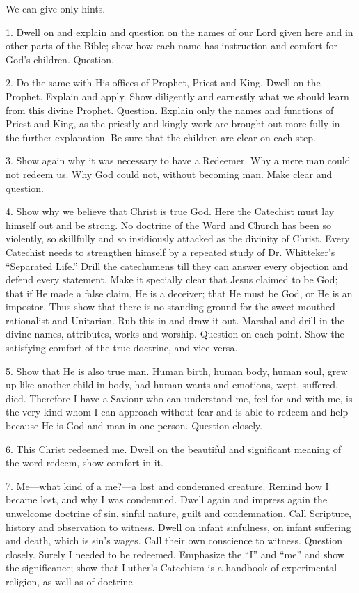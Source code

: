 We can give only hints.

1. Dwell on and explain and question on the names of our Lord given here and in other parts of the Bible; show how each name has instruction and comfort for God’s children. Question.

 2. Do the same with His offices of Prophet, Priest and King. Dwell on the Prophet. Explain and apply. Show diligently and earnestly what we should learn from this divine Prophet. Question. Explain only the names and functions of Priest and King, as the priestly and kingly work are brought out more fully in the further explanation. Be sure that the children are clear on each step.

3. Show again why it was necessary to have a Redeemer. Why a mere man could not redeem us. Why God could not, without becoming man. Make clear and question.

 4. Show why we believe that Christ is true God. Here the Catechist must lay himself out and be strong. No doctrine of the Word and Church has been so violently, so skillfully and so insidiously attacked as the divinity of Christ. Every Catechist needs to strengthen himself by a repeated study of Dr. Whitteker’s “Separated Life.” Drill the catechumens till they can answer every objection and
defend every statement. Make it specially clear that Jesus claimed to be God; that if He made a false claim, He is a deceiver; that He must be God, or He is an impostor. Thus show that there is no standing-ground for the sweet-mouthed rationalist and Unitarian. Rub this in and draw it out. Marshal and drill in the divine names, attributes, works and worship. Question on each point. Show the satisfying comfort of the true doctrine, and vice versa.

5. Show that He is also true man.  Human birth, human body, human soul, grew up like another child in body, had human wants and emotions, wept, suffered, died. Therefore I have a Saviour who can understand me, feel for and with me, is the very kind whom I can approach without fear and is able to redeem and help because He is God and man in one person. Question closely.

6. This Christ redeemed me. Dwell on the beautiful and significant meaning of the word redeem, show comfort in it.

7. Me—what kind of a me?—a lost and condemned creature.  Remind how I became lost, and why I was condemned. Dwell again and impress again the unwelcome doctrine of sin, sinful nature, guilt and condemnation. Call Scripture, history and observation to witness. Dwell on infant sinfulness, on infant suffering and death, which is sin’s wages.
Call their own conscience to witness. Question closely. Surely I needed to be redeemed. Emphasize the “I” and “me” and show the significance; show that Luther’s Catechism is a handbook of experimental religion, as well as of doctrine.

